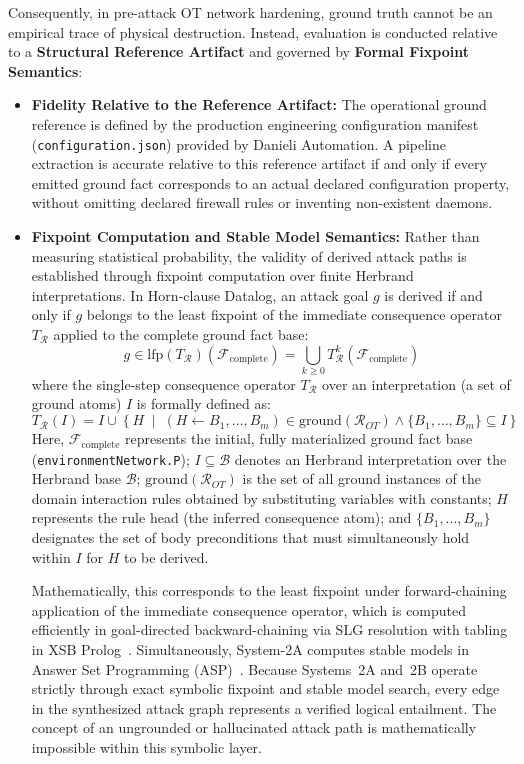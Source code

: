 \documentclass[target=mst,aauheader=aics,style=]{thud}
\begin{document}
Consequently, in pre-attack OT network hardening, ground truth cannot be an empirical trace of physical destruction. Instead, evaluation is conducted relative to a \textbf{Structural Reference Artifact} and governed by \textbf{Formal Fixpoint Semantics}:
\begin{itemize}
    \item \textbf{Fidelity Relative to the Reference Artifact:} The operational ground reference is defined by the production engineering configuration manifest (\texttt{configuration.json}) provided by Danieli Automation. A pipeline extraction is accurate relative to this reference artifact if and only if every emitted ground fact corresponds to an actual declared configuration property, without omitting declared firewall rules or inventing non-existent daemons.
\item \textbf{Fixpoint Computation and Stable Model Semantics:} Rather than measuring statistical probability, the validity of derived attack paths is established through fixpoint computation over finite Herbrand interpretations. In Horn-clause Datalog, an attack goal $g$ is derived if and only if $g$ belongs to the least fixpoint of the immediate consequence operator $T_{\mathcal{R}}$ applied to the complete ground fact base:
\begin{equation}
    g \in \text{lfp}(T_{\mathcal{R}})(\mathcal{F}_{\text{complete}}) = \bigcup_{k \ge 0} T_{\mathcal{R}}^k(\mathcal{F}_{\text{complete}})
    \label{eq:datalog_fixpoint}
\end{equation}
where the single-step consequence operator $T_{\mathcal{R}}$ over an interpretation (a set of ground atoms) $I$ is formally defined as:
\begin{equation}
    T_{\mathcal{R}}(I) = I \cup \left\{ H \;\middle|\; (H \leftarrow B_1, \dots, B_m) \in \text{ground}(\mathcal{R}_{OT}) \land \{B_1, \dots, B_m\} \subseteq I \right\}
\end{equation}
Here, $\mathcal{F}_{\text{complete}}$ represents the initial, fully materialized ground fact base (\texttt{environmentNetwork.P}); $I \subseteq \mathcal{B}$ denotes an Herbrand interpretation over the Herbrand base $\mathcal{B}$; $\text{ground}(\mathcal{R}_{OT})$ is the set of all ground instances of the domain interaction rules obtained by substituting variables with constants; $H$ represents the rule head (the inferred consequence atom); and $\{B_1, \dots, B_m\}$ designates the set of body preconditions that must simultaneously hold within $I$ for $H$ to be derived. 

Mathematically, this corresponds to the least fixpoint under forward-chaining application of the immediate consequence operator, which is computed efficiently in goal-directed backward-chaining via SLG resolution with tabling in XSB Prolog~\cite{swift2012xsb}. Simultaneously, System-2A computes stable models in Answer Set Programming (ASP)~\cite{clingo}. Because Systems~2A and~2B operate strictly through exact symbolic fixpoint and stable model search, every edge in the synthesized attack graph represents a verified logical entailment. The concept of an ungrounded or hallucinated attack path is mathematically impossible within this symbolic layer.
\end{itemize}
\end{document}
